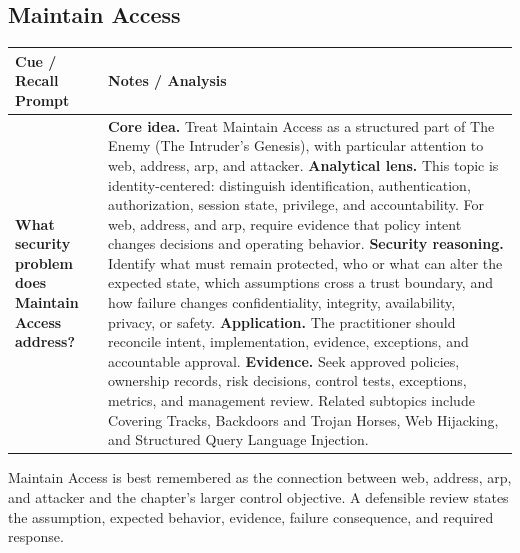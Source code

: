 \documentclass[11pt]{article}
\newcommand{\CornellHeader}{%
\rowcolor{Navy}\color{white}\bfseries Cue / Recall Prompt & \color{white}\bfseries Notes / Analysis\\\hline}
\newcommand{\CornellRow}[2]{%
\cellcolor{CueGray}\RaggedRight\textbf{#1} & \RaggedRight #2\\\hline}
\begin{document}
\subsection*{Maintain Access}
\begin{longtable}{>{\RaggedRight\arraybackslash}p{}|>{\RaggedRight\arraybackslash}p{}}
\CornellHeader
\CornellRow{What security problem does Maintain Access address?}{\textbf{Core idea.} Treat Maintain Access as a structured part of The Enemy (The Intruder's Genesis), with particular attention to web, address, arp, and attacker. \textbf{Analytical lens.} This topic is identity-centered: distinguish identification, authentication, authorization, session state, privilege, and accountability. For web, address, and arp, require evidence that policy intent changes decisions and operating behavior. \textbf{Security reasoning.} Identify what must remain protected, who or what can alter the expected state, which assumptions cross a trust boundary, and how failure changes confidentiality, integrity, availability, privacy, or safety. \textbf{Application.} The practitioner should reconcile intent, implementation, evidence, exceptions, and accountable approval. \textbf{Evidence.} Seek approved policies, ownership records, risk decisions, control tests, exceptions, metrics, and management review. Related subtopics include Covering Tracks, Backdoors and Trojan Horses, Web Hijacking, and Structured Query Language Injection.}
\end{longtable}
\begin{topicsummary}
Maintain Access is best remembered as the connection between web, address, arp, and attacker and the chapter's larger control objective. A defensible review states the assumption, expected behavior, evidence, failure consequence, and required response.
\end{topicsummary}
\end{document}
